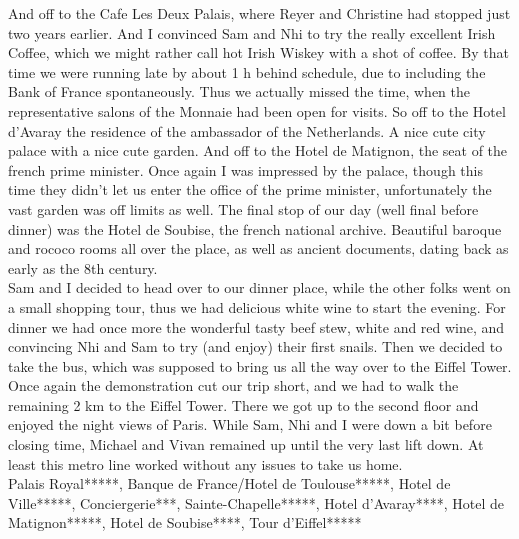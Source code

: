 And off to the Cafe Les Deux Palais, where Reyer and Christine had stopped just two years earlier. And I convinced Sam and Nhi to try the really excellent Irish Coffee, which we might rather call hot Irish Wiskey with a shot of coffee. By that time we were running late by about 1 h behind schedule, due to including the Bank of France spontaneously. Thus we actually missed the time, when the representative salons of the Monnaie had been open for visits. So off to the Hotel d'Avaray the residence of the ambassador of the Netherlands. A nice cute city palace with a nice cute garden. And off to the Hotel de Matignon, the seat of the french prime minister. Once again I was impressed by the palace, though this time they didn't let us enter the office of the prime minister, unfortunately the vast garden was off limits as well. The final stop of our day (well final before dinner) was the Hotel de Soubise, the french national archive. Beautiful baroque and rococo rooms all over the place, as well as ancient documents, dating back as early as the 8th century.\\
Sam and I decided to head over to our dinner place, while the other folks went on a small shopping tour, thus we had delicious white wine to start the evening. For dinner we had once more the wonderful tasty beef stew, white and red wine, and convincing Nhi and Sam to try (and enjoy) their first snails. Then we decided to take the bus, which was supposed to bring us all the way over to the Eiffel Tower. Once again the demonstration cut our trip short, and we had to walk the remaining 2 km to the Eiffel Tower. There we got up to the second floor and enjoyed the night views of Paris. While Sam, Nhi and I were down a bit before closing time, Michael and Vivan remained up until the very last lift down. At least this metro line worked without any issues to take us home.\\

Palais Royal*****, Banque de France/Hotel de Toulouse*****, Hotel de Ville*****, Conciergerie***, Sainte-Chapelle*****, Hotel d'Avaray****, Hotel de Matignon*****, Hotel de Soubise****, Tour d'Eiffel*****\\

